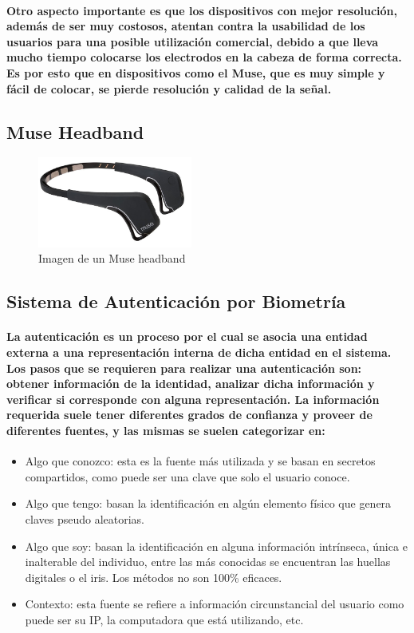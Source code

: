 \documentclass{article}
\begin{document}
\paragraph{
Otro aspecto importante es que los dispositivos con mejor resolución, además de ser muy costosos, atentan contra la usabilidad de los usuarios para una posible utilización comercial, debido a que lleva mucho tiempo colocarse los electrodos en la cabeza de forma correcta. Es por esto que en dispositivos como el Muse, que es muy simple y fácil de colocar, se pierde resolución y calidad de la señal.
}

\subsection{Muse Headband}
\begin{figure}[ht]
    \centering
    \includegraphics[width=2in]{museheadband.jpg}%
    \caption{Imagen de un Muse headband}
    \label{fig:muse}
\end{figure}

\subsection{Sistema de Autenticación por Biometría}
\paragraph{
La autenticación es un proceso por el cual se asocia una entidad externa a una representación interna de dicha entidad en el sistema. Los pasos que se requieren para realizar una autenticación son: obtener información de la identidad, analizar dicha información y verificar si corresponde con alguna representación. La información requerida suele tener diferentes grados de confianza y proveer de diferentes fuentes, y las mismas se suelen categorizar en:
}
\begin{itemize}
  \item Algo que conozco: esta es la fuente más utilizada y se basan en secretos compartidos, como puede ser una clave que solo el usuario conoce.
  \item Algo que tengo: basan la identificación en algún elemento físico que genera claves pseudo aleatorias.
  \item Algo que soy: basan la identificación en alguna información intrínseca, única e inalterable del individuo, entre las más conocidas se encuentran las huellas digitales o el iris. Los métodos no son 100\% eficaces.
  \item Contexto: esta fuente se refiere a información circunstancial del usuario como puede ser su IP, la computadora que está utilizando, etc.
\end{itemize}
\end{document}
